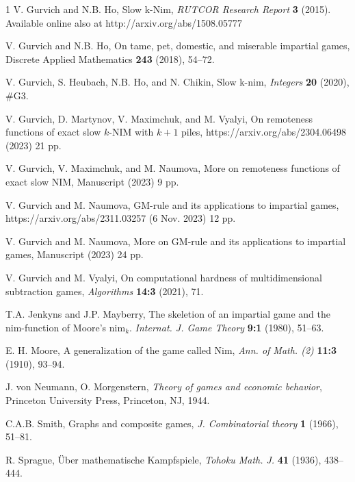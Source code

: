 \documentclass[10pt]{article}
\theoremstyle{definition}
\begin{document}
\begin{thebibliography}{1}
V. Gurvich and N.B. Ho, Slow k-Nim, 
{\it RUTCOR Research Report} {\bf3} (2015). 
Available online also at
http://arxiv.org/abs/1508.05777

V. Gurvich and N.B. Ho,
On tame, pet, domestic, and miserable impartial games,
Discrete Applied Mathematics {\bf 243} (2018), 54--72.

V. Gurvich, S. Heubach, N.B. Ho, and N. Chikin, 
Slow k-nim, {\it Integers} {\bf20} (2020),  \#G3.


V. Gurvich, D. Martynov, V. Maximchuk, and M. Vyalyi,  
On remoteness functions of exact slow $k$-NIM with $k+1$ piles,  
https://arxiv.org/abs/2304.06498 (2023) 21 pp.  

V. Gurvich, V. Maximchuk, and M. Naumova,  
More on remoteness functions of exact slow NIM, 
Manuscript (2023) 9 pp. 

V. Gurvich and M. Naumova,   
GM-rule and its applications to impartial games, 
https://arxiv.org/abs/2311.03257 (6 Nov. 2023) 12 pp. 

V. Gurvich and M. Naumova,   
More on GM-rule and its applications to impartial games, 
Manuscript (2023) 24 pp.  %



V. Gurvich and M. Vyalyi,  On computational hardness of
multidimensional subtraction games, 
{\it Algorithms} {\bf 14:3} (2021), 71.

T.A. Jenkyns and J.P. Mayberry,
The skeletion of an impartial game
and the nim-function of Moore's nim$_k$.
{\it Internat. J.  Game Theory} {\bf9:1} (1980), 51--63.

E. H. Moore, A generalization of the game called Nim, 
{\it Ann. of Math. (2)} {\bf11:3} (1910), 93--94.

J. von Neumann, O. Morgenstern, 
{\it Theory of games and economic behavior}, 
Princeton University Press, Princeton, NJ, 1944.

C.A.B. Smith, Graphs and composite games,
{\it J. Combinatorial theory} {\bf1}  (1966), 51--81.

R. Sprague, \"{U}ber mathematische Kampfspiele, 
{\it Tohoku Math. J.} {\bf41} (1936), 438--444.

\end{thebibliography}
\end{document}
